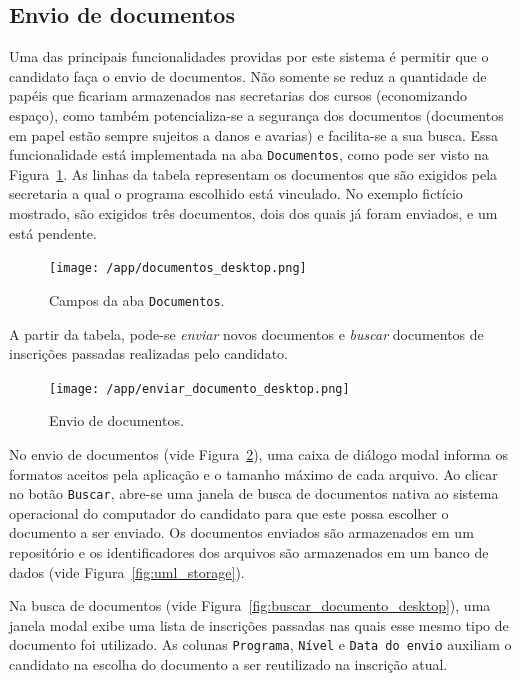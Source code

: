 \documentclass[
  10.5pt,				  %
	openright,			%
	twoside,			  %
  a5paper,
  chapter=TITLE,	%
	section=TITLE,	%
  hyphens,        %
	english,        %
	brazil          %
]{abntex2}
\begin{document}
\subsection{Envio de documentos}\label{sec:envio_documentos}

Uma das principais funcionalidades providas por este sistema é permitir que o candidato faça o envio de documentos. Não somente se reduz a quantidade de papéis que ficariam armazenados nas secretarias dos cursos (economizando espaço), como também potencializa-se a segurança dos documentos (documentos em papel estão sempre sujeitos a danos e avarias) e facilita-se a sua busca. Essa funcionalidade está implementada na aba \texttt{Documentos}, como pode ser visto na Figura~\ref{fig:documentos_desktop}. As linhas da tabela representam os documentos que são exigidos pela secretaria a qual o programa escolhido está vinculado. No exemplo fictício mostrado, são exigidos três documentos, dois dos quais já foram enviados, e um está pendente.
%
\begin{figure}[!ht]
  \caption{\label{fig:documentos_desktop} Campos da aba \texttt{Documentos}.}
  \begin{center}
    \texttt{[image: /app/documentos\_desktop.png]}
  \end{center}
\end{figure}

A partir da tabela, pode-se \emph{enviar} novos documentos e \emph{buscar} documentos de inscrições passadas realizadas pelo candidato.
%
\begin{figure}[!ht]
  \caption{\label{fig:enviar_documento_desktop} Envio de documentos.}
  \begin{center}
    \texttt{[image: /app/enviar\_documento\_desktop.png]}
  \end{center}
\end{figure}

No envio de documentos (vide Figura~\ref{fig:enviar_documento_desktop}), uma caixa de diálogo modal informa os formatos aceitos pela aplicação e o tamanho máximo de cada arquivo. Ao clicar no botão \texttt{Buscar}, abre-se uma janela de busca de documentos nativa ao sistema operacional do computador do candidato para que este possa escolher o documento a ser enviado. Os documentos enviados são armazenados em um repositório e os identificadores dos arquivos são armazenados em um banco de dados (vide Figura~\ref{fig:uml_storage}).

Na busca de documentos (vide Figura~\ref{fig:buscar_documento_desktop}), uma janela modal exibe uma lista de inscrições passadas nas quais esse mesmo tipo de documento foi utilizado. As colunas \texttt{Programa}, \texttt{Nível} e \texttt{Data do envio} auxiliam o candidato na escolha do documento a ser reutilizado na inscrição atual.
\end{document}
